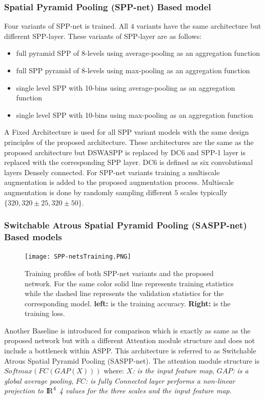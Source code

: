 \subsubsection{Spatial Pyramid Pooling (SPP-net) Based model}
Four variants of SPP-net\cite{he2015spatial} is trained. All $4$ variants have the same architecture but different SPP-layer. These variants of SPP-layer are as follows:
\begin{itemize}
  \item full pyramid SPP of 8-levels using average-pooling as an aggregation function
  \item full SPP pyramid of 8-levels using max-pooling as an aggregation function
  \item single level SPP with 10-bins using average-pooling as an aggregation function
  \item single level SPP with 10-bins using max-pooling as an aggregation function
\end{itemize}
  A Fixed Architecture is used for all SPP variant models with the same design principles of the proposed architecture. These architectures are the same as the proposed architecture but DSWASPP is replaced by DC6 and SPP-1 layer is replaced with the corresponding SPP layer. DC6 is defined as six convolutional layers Densely connected. For SPP-net variants training a multiscale augmentation is added to the proposed augmentation process. Multiscale augmentation is done by randomly sampling different $5$ scales typically $\{320, 320\pm25, 320\pm50 \}$.
\subsubsection{Switchable Atrous Spatial Pyramid Pooling (SASPP-net) Based models} 
\begin{center}
\begin{figure}[htbp]
\centerline{\texttt{[image: SPP-netsTraining.PNG]}}
\caption{Training profiles of both SPP-net variants and the proposed network. For the same color solid line represents training statistics while the dashed line represents the validation statistics for the corresponding model. \textbf{left:} is the training accuracy. \textbf{Right:} is the training loss.}
\label{SPP-train}
\end{figure}
\end{center}

Another Baseline is introduced for comparison which is exactly as same as the proposed network but with a different Attention module structure and does not include a bottleneck within ASPP. This architecture is referred to as Switchable Atrous Spatial Pyramid Pooling (SASPP-net). The attention module structure is $Softmax(FC(GAP(X)))$ where: \textit{$X$: is the input feature map}, \textit{$GAP$: is a global average pooling}, \textit{$FC$: is fully Connected layer performs a non-linear projection to ${\rm I\!R}^{4}$ 4 values for the three scales and the input feature map}.\\

